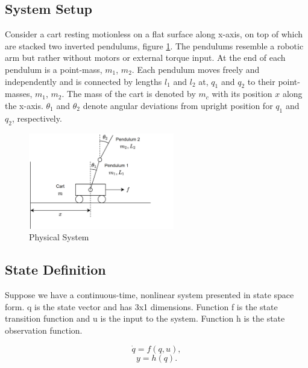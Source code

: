 \documentclass[journal]{IEEEtran}
\begin{document}

\subsection{System Setup}
Consider a cart resting motionless on a flat surface along x-axis, on top of
which are stacked two inverted pendulums, figure \ref{fig:cart}.
The pendulums resemble a
robotic arm but rather without motors or external torque input. At the end of
each pendulum is a point-mass, \(m_1\), \(m_2\). Each pendulum
moves freely and independently and is connected by lengths \(l_1\) and \(l_2\)
at, \(q_1\) and \(q_2\) to their point-masses, \(m_1\),
\(m_2\). The mass of the cart is denoted
by \(m_c\) with its position \(x\) along the x-axis. \(\theta_1\) and
\(\theta_2\) denote angular deviations from upright position for \(q_1\) and
\(q_2\), respectively.


\begin{figure}[!t]
    \centering
    \includegraphics[width=2.5in]{fig01_cart001.png}
    \caption{Physical System}
    \label{fig:cart}
\end{figure}


\subsection{State Definition}
Suppose we have a continuous-time, nonlinear system presented in state space
form.  q is the state vector and has 3x1 dimensions. Function f is the
state transition function and u is the input to the system. Function h is the
state observation function.

\begin{equation}
    \dot{q} = f(q,u),
\end{equation}
\begin{equation}
    y = h(q).
\end{equation}
\end{document}
